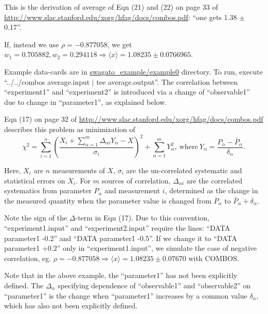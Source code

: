 \documentclass[12pt,a4paper,dvips]{article}
\begin{document}
This is the derivation of average of Eqn (21) and (22) on page 33 of \url{http://www.slac.stanford.edu/xorg/hfag/docs/combos.pdf}: 
``one gets 1.38 $\pm$ 0.17''.

If, instead we use $\rho = - 0.877058$, we get $w_1 = 0.705882, w_2 = 0.294118 \Rightarrow \langle x \rangle = 1.08235 \pm 0.0766965$.


Example data-cards are in \url{swagato_example/example0} directory.
To run, execute ``../../combos average.input $|$ tee average.output''.
The correlation between ``experiment1'' and ``experiment2'' is introduced 
via a change of ``observable1'' due to change in ``parameter1'', as explained below.

Eqn (17) on page 32 of \url{http://www.slac.stanford.edu/xorg/hfag/docs/combos.pdf} describes this problem as minimization of 
$$\chi^2 = \sum_{i=1}^{n} \left( \frac{X_i + \sum_{\alpha=1}^{m} \Delta_{\alpha i}Y_\alpha -X}{\sigma_i} \right)^2 
        + \sum_{\alpha=1}^{m} Y_\alpha^2, \mathrm{~where~} Y_\alpha = \frac{P_\alpha - \bar{P}_\alpha}{\delta_\alpha}.$$

Here, $X_i$ are $n$ measurements of $X$, $\sigma_i$ are the un-correlated systematic and statistical errors on $X_i$.
For $m$ sources of correlation, $\Delta_{\alpha i}$ are the correlated systematics from parameter $P_\alpha$ and 
measurement $i$, determined as the change in the measured quantity when the parameter value is changed from 
$\bar{P}_\alpha$ to $\bar{P}_\alpha + \delta_\alpha$. 

Note the sign of the $\Delta$-term in Eqn (17).
Due to this convention, ``experiment1.input'' and ``experiment2.input'' require the lines: ``DATA        parameter1 -0.2'' and 
``DATA        parameter1 -0.5''. If we change it to ``DATA        parameter1 +0.2'' only in ``experiment1.input'',
we simulate the case of negative correlation, 
eg. $\rho = - 0.877058 \Rightarrow \langle x \rangle = 1.08235 \pm 0.07670$ with COMBOS.

Note that in the above example, the ``parameter1'' has not been explicitly defined.
The $\Delta_\alpha$ specifying dependence of ``observable1'' and ``observable2'' on ``parameter1'' is the change when ``parameter1''
increases by a common value $\delta_\alpha$, which has also not been explicitly defined.
\end{document}
